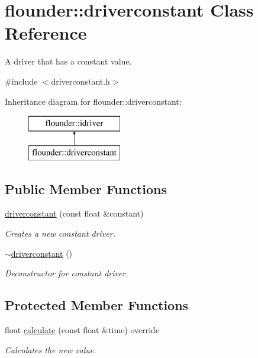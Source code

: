 \hypertarget{classflounder_1_1driverconstant}{}\section{flounder\+:\+:driverconstant Class Reference}
\label{classflounder_1_1driverconstant}


A driver that has a constant value.  




{\ttfamily \#include $<$driverconstant.\+h$>$}

Inheritance diagram for flounder\+:\+:driverconstant\+:\begin{figure}[H]
\begin{center}
\leavevmode
\includegraphics[height=2.000000cm]{classflounder_1_1driverconstant}
\end{center}
\end{figure}
\subsection*{Public Member Functions}
\begin{DoxyCompactItemize}
\item 
\hyperlink{classflounder_1_1driverconstant_a678370c3748065cea8fc7ca6f46c2a19}{driverconstant} (const float \&constant)
\begin{DoxyCompactList}\small\item\em Creates a new constant driver. \end{DoxyCompactList}\item 
\hyperlink{classflounder_1_1driverconstant_abedf27fbdda1f3521c15e555ba54633e}{$\sim$driverconstant} ()
\begin{DoxyCompactList}\small\item\em Deconstructor for constant driver. \end{DoxyCompactList}\end{DoxyCompactItemize}
\subsection*{Protected Member Functions}
\begin{DoxyCompactItemize}
\item 
float \hyperlink{classflounder_1_1driverconstant_acf786b61ab46ea1ebf8d9a802c33c441}{calculate} (const float \&time) override
\begin{DoxyCompactList}\small\item\em Calculates the new value. \end{DoxyCompactList}\end{DoxyCompactItemize}
